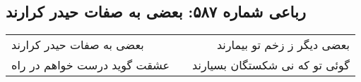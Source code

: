 \begin{center}
\section*{رباعی شماره ۵۸۷: بعضی به صفات حیدر کرارند}
\label{sec:0587}
\begin{longtable}{l p{0.5cm} r}
بعضی به صفات حیدر کرارند
&&
بعضی دیگر ز زخم تو بیمارند
\\
عشقت گوید درست خواهم در راه
&&
گوئی تو که نی شکستگان بسیارند
\\
\end{longtable}
\end{center}
